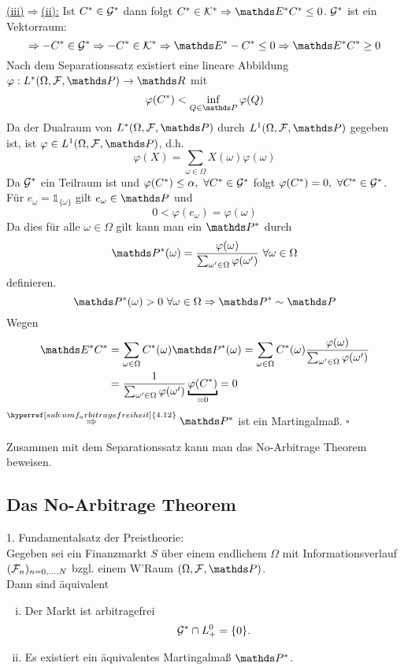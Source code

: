 \uline{(iii)$\Rightarrow$(ii):}
Ist $C^*\in \mathcal{G}^*$ dann folgt $C^*\in \mc{K}^*\Rightarrow \E^*C^*\le 0$.
$\mathcal{G}^*$ ist ein Vektorraum:
\[
\Rightarrow -C^*\in\G^*\Rightarrow-C^*\in\mc{K}^*\Rightarrow\E^*-C^*\le 0\Rightarrow\E^*C^*\ge 0
\]
Nach dem Separationssatz existiert eine lineare Abbildung $\varphi:L^*(\Omega,\F,\Pw)\to \R$ mit
\[
\varphi(C^*)<\inf\limits_{Q\in \Pw}\varphi(Q)
\]
Da der Dualraum von $L^*(\Omega,\F,\Pw)$ durch $L^1(\Omega,\F,\Pw)$ gegeben ist, ist $\varphi\in L^1(\Omega,\F,\Pw)$, d.h.
\[
\varphi(X)=\sum_{\omega\in \Omega} X(\omega)\varphi(\omega)
\]
Da $\mathcal{G}^*$ ein Teilraum ist und $\varphi(C^*)\le \alpha,~\forall C^*\in \mathcal{G}^*$ folgt $\varphi(C^*)=0,~\forall C^*\in \mathcal{G}^*$.\\
Für $e_\omega=\mathbb{1}_{\{\omega\}}$ gilt $e_\omega\in \Pw$ und
\[
0<\varphi(e_\omega)=\varphi(\omega)
\]
Da dies für alle $\omega\in\Omega$ gilt kann man ein $\Pw^*$ durch
\[
\Pw^*(\omega)=\frac{\varphi(\omega)}{\sum_{\omega'\in\Omega}\varphi(\omega')}~\forall \omega\in\Omega
\]
definieren.
\[
\Pw^*(\omega)>0~\forall \omega\in\Omega \Rightarrow \Pw^*\sim \Pw
\]
Wegen
\begin{equation*}
\begin{aligned}
	\E^*C^* &= \sum_{\omega\in\Omega}C^*(\omega)\Pw^*(\omega) = \sum_{\omega\in \Omega}C^*(\omega)\frac{\varphi(\omega)}{\sum_{\omega'\in\Omega}\varphi(\omega')}\\
	&= \frac{1}{\sum_{\omega'\in\Omega}\varphi(\omega')}\underbracket{\varphi(C^*)}_{=0}=0
\end{aligned}
\end{equation*}
$\stackrel{\hyperref[sub:umf_arbitragefreiheit]{4.12}}{\Rightarrow} \Pw^*$ ist ein Martingalmaß.
\hfill $\square$

Zusammen mit dem Separationssatz kann man das No-Arbitrage Theorem beweisen.

\subsection{Das No-Arbitrage Theorem}
\label{sub:no-arbitrage_theorem}
1. Fundamentalsatz der Preistheorie:\\
Gegeben sei ein Finanzmarkt $S$ über einem endlichem $\Omega$ mit Informationsverlauf $(\mathcal{F}_n)_{n=0,\dots,N}$ bzgl. einem W'Raum $(\Omega,\F,\Pw)$.\\
Dann sind äquivalent
\begin{enumerate}[(i)]
	\item Der Markt ist arbitragefrei
	\[
	\mathcal{G}^*\cap L_+^0=\{0\}.
	\]
	\item Es existiert ein äquivalentes Martingalmaß $\Pw^*$.
\end{enumerate}

